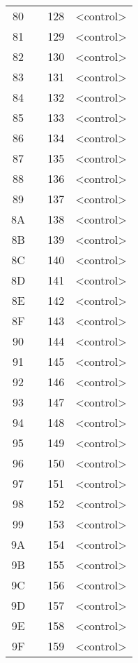 \documentclass[10pt]{article}
\begin{document}
\begin{tabular}{ccrl}
80& &128&<control>\\
81& &129&<control>\\
82& &130&<control>\\
83& &131&<control>\\
84& &132&<control>\\
85& &133&<control>\\
86& &134&<control>\\
87& &135&<control>\\
88& &136&<control>\\
89& &137&<control>\\
8A& &138&<control>\\
8B& &139&<control>\\
8C& &140&<control>\\
8D& &141&<control>\\
8E& &142&<control>\\
8F& &143&<control>\\
90& &144&<control>\\
91& &145&<control>\\
92& &146&<control>\\
93& &147&<control>\\
94& &148&<control>\\
95& &149&<control>\\
96& &150&<control>\\
97& &151&<control>\\
98& &152&<control>\\
99& &153&<control>\\
9A& &154&<control>\\
9B& &155&<control>\\
9C& &156&<control>\\
9D& &157&<control>\\
9E& &158&<control>\\
9F& &159&<control>\\
\end{tabular}
\end{document}
